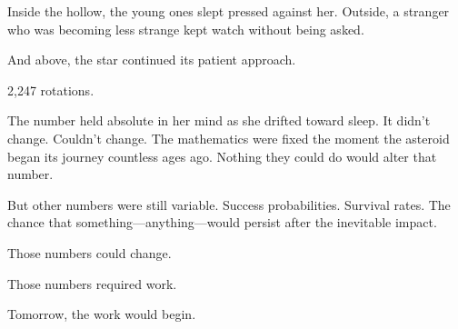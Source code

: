 Inside the hollow, the young ones slept pressed against her. Outside, a stranger who was becoming less strange kept watch without being asked.

And above, the star continued its patient approach.

2,247 rotations.

The number held absolute in her mind as she drifted toward sleep. It didn't change. Couldn't change. The mathematics were fixed the moment the asteroid began its journey countless ages ago. Nothing they could do would alter that number.

But other numbers were still variable. Success probabilities. Survival rates. The chance that something—anything—would persist after the inevitable impact.

Those numbers could change.

Those numbers required work.

Tomorrow, the work would begin.


